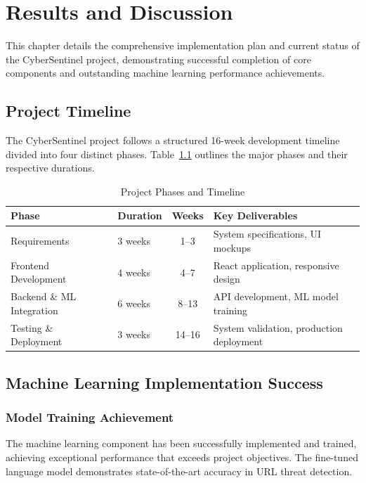 \chapter{Results and Discussion}

This chapter details the comprehensive implementation plan and current status of the CyberSentinel project, demonstrating successful completion of core components and outstanding machine learning performance achievements.

\section{Project Timeline}

The CyberSentinel project follows a structured 16-week development timeline divided into four distinct phases. Table~\ref{tab:project-phases} outlines the major phases and their respective durations.

\begin{table}[htbp]
	\centering
	\caption{Project Phases and Timeline}
	\label{tab:project-phases}
	\begin{tabular}{llcl}
		\toprule
		\textbf{Phase} & \textbf{Duration} & \textbf{Weeks} & \textbf{Key Deliverables} \\
		\midrule
		Requirements & 3 weeks & 1--3 & System specifications, UI mockups \\
		Frontend Development & 4 weeks & 4--7 & React application, responsive design \\
		Backend \& ML Integration & 6 weeks & 8--13 & API development, ML model training \\
		Testing \& Deployment & 3 weeks & 14--16 & System validation, production deployment \\
		\bottomrule
	\end{tabular}
\end{table}

\section{Machine Learning Implementation Success}

\subsection{Model Training Achievement}

The machine learning component has been successfully implemented and trained, achieving exceptional performance that exceeds project objectives. The fine-tuned language model demonstrates state-of-the-art accuracy in URL threat detection.

